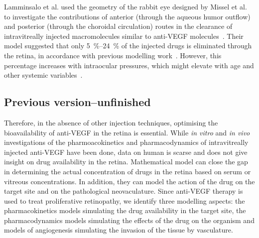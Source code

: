 \documentclass[11pt,a4paper]{article}
\begin{document}
Lamminsalo et al. used the geometry of the rabbit eye designed by Missel et al. to investigate the contributions of anterior (through the aqueous humor outflow) and posterior (through the choroidal circulation) routes in the clearance of intravitreally injected macromolecules similar to anti-VEGF molecules~\cite{Lamminsalo_2018}.
Their model suggested that only \SIrange{5}{24}{\percent} of the injected drugs is eliminated through the retina, in accordance with previous modelling work~\cite{hutton-smith_ocular_2017}.
However, this percentage increases with intraocular pressures, which might elevate with age and other systemic variables~\cite{Armaly1967,Hashemi2005}.







\subsection{Previous version--unfinished}

Therefore, in the absence of other injection techniques, optimising the bioavailability of anti-VEGF in the retina is essential.
While \textit{in vitro} and \textit{in vivo} investigations of the pharmoacokinetics and pharmacodynamics of intravitreally injected anti-VEGF have been done, data on human is scarse and does not give insight on drug availability in the retina.
Mathematical model can close the gap in determining the actual concentration of drugs in the retina based on serum or vitreous concentrations.
In addition, they can model the action of the drug on the target site and on the pathological neovaculature.
Since anti-VEGF therapy is used to treat proliferative retinopathy, we identify three modelling aspects: the pharmacokinetics models simulating the drug availability in the target site, the pharmacodynamics models simulating the effects of the drug on the organism and models of angiogenesis simulating the invasion of the tissue by vasculature.
\end{document}
